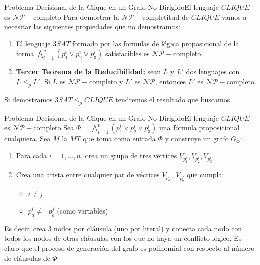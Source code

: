 \documentclass[10pt, envcountsect, presentation, aspectratio=169]{beamer}
\begin{document}
\begin{frame}{Problema Decisional de la Clique en un Grafo No Dirigido}{El lenguaje $CLIQUE$ es $\mathcal{NP}-$completo}
    Para demostrar la $\mathcal{NP}-$completitud de $CLIQUE$ vamos a necesitar las siguientes propiedades que no demostramos:
    \begin{enumerate}[1]
        \item El lenguaje $3SAT$ formado por las formulas de lógica proposicional de la forma $\bigwedge_{i=1}^n(p_1^i \vee p_2^i \vee p_3^i)$ satisfacibles es $\mathcal{NP}-$completo.
        \item \textbf{Tercer Teorema de la Reducibilidad:} sean $L$ y $L'$ dos lenguajes con $L \leq_p L'$. Si $L$ es $\mathcal{NP}-$completo y $L'$ es $\mathcal{NP}$, entonces $L'$ es $\mathcal{NP}-$completo. 
    \end{enumerate}
    Si demostramos $3SAT \leq_p CLIQUE$ tendremos el resultado que buscamos. 
\end{frame}

\begin{frame}{Problema Decisional de la Clique en un Grafo No Dirigido}{El lenguaje $CLIQUE$ es $\mathcal{NP}-$completo}
    Sea $\Phi=\bigwedge_{i=1}^n(p_1^i \vee p_2^i \vee p_3^i)$ una fórmula proposicional cualquiera. Sea $M$ la $MT$ que toma como entrada $\Phi$ y construye un grafo $G_\Phi$:
    \begin{enumerate}
        \item Para cada $i=1,\dots,n$, crea un grupo de tres vértices $V_{p_1^i}, V_{p_2^i}, V_{p_3^i}$
        \item Crea una arista entre cualquier par de véctices $V_{p_a^i}$, $V_{p_b^j}$ que cumpla:
        \begin{itemize}
            \item[] $i \neq j$
            \item[] $p_a^i \neq \neg p_b^j$ (como variables)
        \end{itemize}
    \end{enumerate}
    Es decir, crea 3 nodos por cláusula (uno por literal) y conecta cada nodo con todos los nodos de otras cláusulas con los que no haya un conflicto lógico.
    Es claro que el proceso de generación del grafo es polinomial con respecto al número de cláusulas de $\Phi$
\end{frame}

\end{document}
